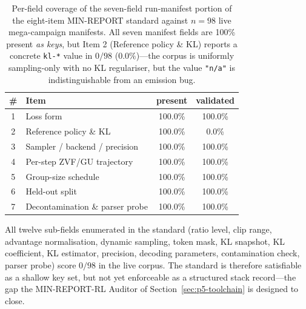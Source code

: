 \documentclass{article}  \usepackage[preprint,nonatbib]{neurips_2026} \usepackage[numbers]{natbib}
\providecommand{\secref}[1]{Section~\ref{#1}}
\begin{document}
\begin{table}[t]
\centering
\caption{Per-field coverage of the seven-field run-manifest portion of the
eight-item MIN-REPORT standard against
$n=98$ live mega-campaign manifests. All seven manifest fields are 100\% present
\emph{as keys}, but Item 2 (Reference policy \& KL) reports a concrete
\texttt{kl-*} value in $0/98$ ($0.0\%$)---the corpus is uniformly
sampling-only with no KL regulariser, but the value \texttt{"n/a"} is
indistinguishable from an emission bug.}
\label{tab:p5-coverage}
\small
\begin{tabular}{@{}clcc@{}}
\toprule
\# & Item & present & validated \\
\midrule
1 & Loss form              & 100.0\% & 100.0\% \\
2 & Reference policy \& KL & 100.0\% &   0.0\% \\
3 & Sampler / backend / precision & 100.0\% & 100.0\% \\
4 & Per-step ZVF/GU trajectory   & 100.0\% & 100.0\% \\
5 & Group-size schedule          & 100.0\% & 100.0\% \\
6 & Held-out split               & 100.0\% & 100.0\% \\
7 & Decontamination \& parser probe & 100.0\% & 100.0\% \\
\bottomrule
\end{tabular}
\end{table}

All twelve sub-fields enumerated in the standard (ratio level, clip range,
advantage normalisation, dynamic sampling, token mask, KL snapshot, KL
coefficient, KL estimator, precision, decoding parameters, contamination
check, parser probe) score $0/98$ in the live corpus. The standard is
therefore satisfiable as a shallow key set, but not yet enforceable as a
structured stack record---the gap the MIN-REPORT-RL Auditor of
\secref{sec:p5-toolchain} is designed to close.
\end{document}
